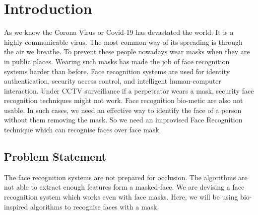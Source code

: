 \documentclass[a4paper,12pt]{report}
\begin{document}

\tableofcontents
\listoffigures
\pagebreak
{}


\chapter{Introduction}
As we know the Corona Virus or Covid-19 has devastated the world. It is a highly communicable virus. The most common way of its spreading is through the air we breathe. To prevent these people nowadays wear masks when they are in public places. Wearing such masks has made the job of face recognition systems harder than before. Face recognition systems are used for identity authentication, security access control, and intelligent human-computer interaction. Under CCTV surveillance if a perpetrator wears a mask, security face recognition techniques might not work. Face recognition bio-metic are also not usable. In such cases, we need an effective way to identify the face of a person without them removing the mask. So we need an improvised Face Recognition technique which can recognise faces over face mask.

\section{Problem Statement}
The face recognition systems are not prepared for occlusion. The algorithms are not able to extract enough features form a masked-face. We are devising a face recognition system which works even with face masks. Here, we will be using bio-inspired algorithms to recognise faces with a mask. 

\end{document}
